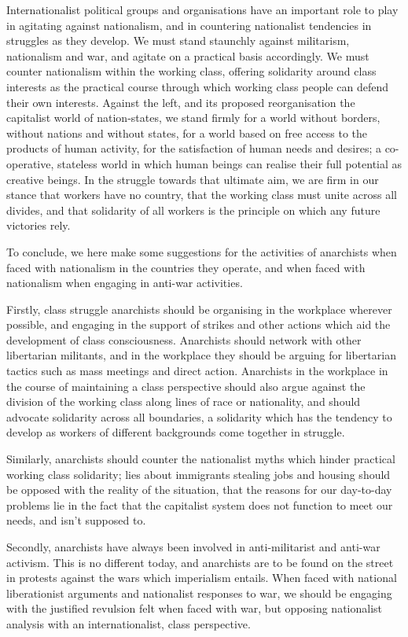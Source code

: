 Internationalist political groups and organisations have an important role to play in agitating against nationalism, and in countering nationalist tendencies in struggles as they develop.
We must stand staunchly against militarism, nationalism and war, and agitate on a practical basis accordingly.
We must counter nationalism within the working class, offering solidarity around class interests as the practical course through which working class people can defend their own interests.
Against the left, and its proposed reorganisation the capitalist world of nation-states, we stand firmly for a world without borders, without nations and without states, for a world based on free access to the products of human activity, for the satisfaction of human needs and desires; a co-operative, stateless world in which human beings can realise their full potential as creative beings.
In the struggle towards that ultimate aim, we are firm in our stance that workers have no country, that the working class must unite across all divides, and that solidarity of all workers is the principle on which any future victories rely.

To conclude, we here make some suggestions for the activities of anarchists when faced with nationalism in the countries they operate, and when faced with nationalism when engaging in anti-war activities.

Firstly, class struggle anarchists should be organising in the workplace wherever possible, and engaging in the support of strikes and other actions which aid the development of class consciousness.
Anarchists should network with other libertarian militants, and in the workplace they should be arguing for libertarian tactics such as mass meetings and direct action.
Anarchists in the workplace in the course of maintaining a class perspective should also argue against the division of the working class along lines of race or nationality, and should advocate solidarity across all boundaries, a solidarity which has the tendency to develop as workers of different backgrounds come together in struggle.

Similarly, anarchists should counter the nationalist myths which hinder practical working class solidarity; lies about immigrants stealing jobs and housing should be opposed with the reality of the situation, that the reasons for our day-to-day problems lie in the fact that the capitalist system does not function to meet our needs, and isn’t supposed to.

Secondly, anarchists have always been involved in anti-militarist and anti-war activism.
This is no different today, and anarchists are to be found on the street in protests against the wars which imperialism entails.
When faced with national liberationist arguments and nationalist responses to war, we should be engaging with the justified revulsion felt when faced with war, but opposing nationalist analysis with an internationalist, class perspective.

